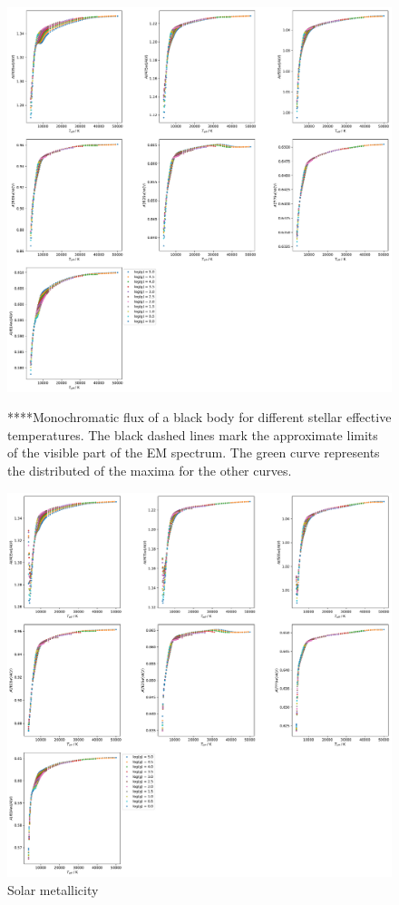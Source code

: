 \documentclass[12pt, a4paper]{report}
\begin{document}
\begin{figure}[h]
\begin{center}
\includegraphics[scale=0.3]{../just_full_data/ACS/AHub_FeHm2p0_just_Teff_fit_plot_dots.pdf}
\caption{****Monochromatic flux of a black body for different stellar effective temperatures. The black dashed lines mark the approximate limits of the visible part of the EM spectrum. The green curve represents the distributed of the maxima for the other curves.}
\label{Ax/Av data FeH=-2}

\includegraphics[scale=0.3]{../just_full_data/ACS/AHub_FeH0p5_just_Teff_fit_plot_dots.pdf}
\caption{Solar metallicity}
\label{Ax/Av data FeH=0}
\end{center}
\end{figure}
\end{document}
